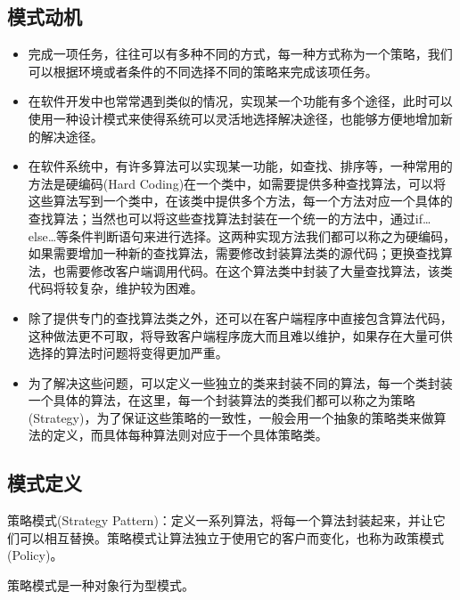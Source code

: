 \documentclass[letterpaper,10pt,english]{sphinxmanual}
\begin{document}
\subsection{模式动机}
\label{\detokenize{behavioral_patterns/strategy:id3}}\begin{itemize}
\item {} 
\sphinxAtStartPar
完成一项任务，往往可以有多种不同的方式，每一种方式称为一个策略，我们可以根据环境或者条件的不同选择不同的策略来完成该项任务。

\item {} 
\sphinxAtStartPar
在软件开发中也常常遇到类似的情况，实现某一个功能有多个途径，此时可以使用一种设计模式来使得系统可以灵活地选择解决途径，也能够方便地增加新的解决途径。

\item {} 
\sphinxAtStartPar
在软件系统中，有许多算法可以实现某一功能，如查找、排序等，一种常用的方法是硬编码(Hard Coding)在一个类中，如需要提供多种查找算法，可以将这些算法写到一个类中，在该类中提供多个方法，每一个方法对应一个具体的查找算法；当然也可以将这些查找算法封装在一个统一的方法中，通过if…else…等条件判断语句来进行选择。这两种实现方法我们都可以称之为硬编码，如果需要增加一种新的查找算法，需要修改封装算法类的源代码；更换查找算法，也需要修改客户端调用代码。在这个算法类中封装了大量查找算法，该类代码将较复杂，维护较为困难。

\item {} 
\sphinxAtStartPar
除了提供专门的查找算法类之外，还可以在客户端程序中直接包含算法代码，这种做法更不可取，将导致客户端程序庞大而且难以维护，如果存在大量可供选择的算法时问题将变得更加严重。

\item {} 
\sphinxAtStartPar
为了解决这些问题，可以定义一些独立的类来封装不同的算法，每一个类封装一个具体的算法，在这里，每一个封装算法的类我们都可以称之为策略(Strategy)，为了保证这些策略的一致性，一般会用一个抽象的策略类来做算法的定义，而具体每种算法则对应于一个具体策略类。

\end{itemize}


\subsection{模式定义}
\label{\detokenize{behavioral_patterns/strategy:id4}}
\sphinxAtStartPar
策略模式(Strategy Pattern)：定义一系列算法，将每一个算法封装起来，并让它们可以相互替换。策略模式让算法独立于使用它的客户而变化，也称为政策模式(Policy)。

\sphinxAtStartPar
策略模式是一种对象行为型模式。
\end{document}
